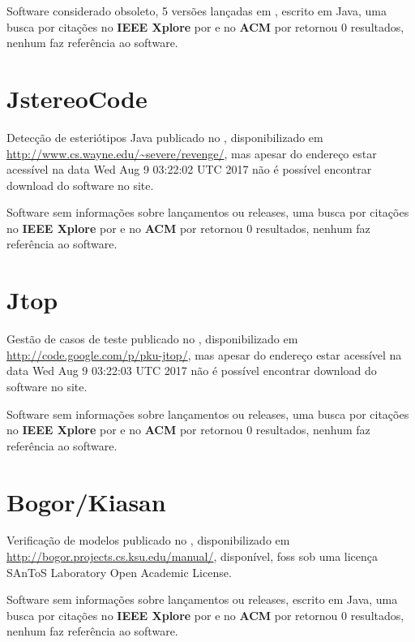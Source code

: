 Software considerado obsoleto,
5 versões lançadas
em ,
escrito em Java,
uma busca por citações no {\bf IEEE Xplore} por
\texttt{}
e no {\bf ACM} por
\texttt{}
retornou
0 resultados,
nenhum faz referência ao software.



\section{JstereoCode}

Detecção de esteriótipos Java
publicado no  ,
disponibilizado em \url{http://www.cs.wayne.edu/~severe/revenge/},
mas apesar do endereço estar acessível na data 
Wed Aug  9 03:22:02 UTC 2017
não é possível encontrar download do software no site.

Software sem informações sobre lançamentos ou releases,
uma busca por citações no {\bf IEEE Xplore} por
\texttt{}
e no {\bf ACM} por
\texttt{}
retornou
0 resultados,
nenhum faz referência ao software.



\section{Jtop}

Gestão de casos de teste
publicado no  ,
disponibilizado em \url{http://code.google.com/p/pku-jtop/},
mas apesar do endereço estar acessível na data 
Wed Aug  9 03:22:03 UTC 2017
não é possível encontrar download do software no site.

Software sem informações sobre lançamentos ou releases,
uma busca por citações no {\bf IEEE Xplore} por
\texttt{}
e no {\bf ACM} por
\texttt{}
retornou
0 resultados,
nenhum faz referência ao software.



\section{Bogor/Kiasan}

Verificação de modelos
publicado no  ,
disponibilizado em \url{http://bogor.projects.cs.ksu.edu/manual/},
disponível,
foss
sob uma licença SAnToS Laboratory Open Academic License.

Software sem informações sobre lançamentos ou releases,
escrito em Java,
uma busca por citações no {\bf IEEE Xplore} por
\texttt{}
e no {\bf ACM} por
\texttt{}
retornou
0 resultados,
nenhum faz referência ao software.




